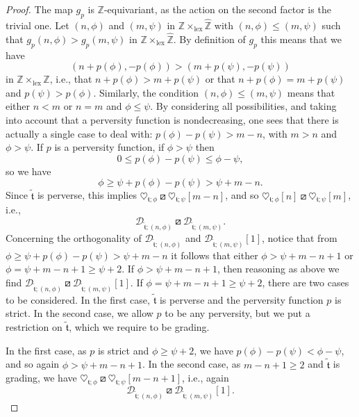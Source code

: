 \documentclass{article}
\theoremstyle{definition}
\newcommand{\Z}{\mathbb{Z}}
\newcommand{\tee}{\mathfrak{t}}
\newcommand{\orth}{\boxslash}
\begin{document}
\begin{proof}
The map $g_p$ is $\Z$-equivariant, as the action on the second factor is the trivial one.  Let $(n,\phi)$ and $(m,\psi)$ in $\Z\times_{\mathrm{lex}} \hat{\Z}$ with $(n,\phi)\leq (m,\psi)$ such that $g_p(n,\phi)>g_p(m,\psi)$ in $\Z\times_{\mathrm{lex}} \hat{\Z}$. By definition of $g_p$ this means that we have
\[
(n+p(\phi),-p(\phi))>(m+p(\psi),-p(\psi))
\]
in $\Z\times_{\mathrm{lex}} \Z$, i.e., that $n+p(\phi)>m+p(\psi)$ or that $n+p(\phi)=m+p(\psi)$ and $p(\psi)>p(\phi)$. Similarly, the condition $(n,\phi)\leq (m,\psi)$ means that either $n<m$ or $n=m$ and $\phi\leq \psi$. By considering all possibilities, and taking into account that a perversity function is nondecreasing, one sees that there is actually a single case to deal with:
$p(\phi)-p(\psi)>m-n$, with $m>n$ and $\phi>\psi$.
If $p$ is a perversity function, if $\phi> \psi$ then
\[
0\leq p(\phi)-p(\psi)\leq \phi-\psi,
\]
so we have
\[
\phi\geq  \psi+ p(\phi)-p(\psi)>\psi+m-n.
\]
Since $\tilde{\tee}$ is perverse, this implies $\heartsuit_{\tee;\phi}\orth\heartsuit_{\tee;\psi}[m-n]$, and so $\heartsuit_{\tee;\phi}[n]\orth \heartsuit_{\tee;\psi}[m]$, i.e.,
\[
\mathscr{D}_{\tilde{\tee};(n,\phi)}\orth\mathscr{D}_{\tilde{\tee};(m,\psi)}.
\]
Concerning the orthogonality of $\mathscr{D}_{\tilde{\tee};(n,\phi)}$ and $\mathscr{D}_{\tilde{\tee};(m,\psi)}[1]$, notice that
from $\phi\geq \psi+ p(\phi)-p(\psi)>\psi+m-n$ it follows that either $\phi>\psi+m-n+1$ or $\phi=\psi+m-n+1\geq \psi+2$.  If $\phi>\psi+m-n+1$, then reasoning as above we find $\mathscr{D}_{\tilde{\tee};(n,\phi)}\orth\mathscr{D}_{\tilde{\tee};(m,\psi)}[1]$. If $\phi=\psi+m-n+1\geq \psi+2$,
there are two cases to be considered. In the first case, $\tilde{\tee}$ is perverse and the perversity function $p$ is strict. In the second case, we allow $p$ to be any perversity, but we put a restriction on $\tilde{\tee}$, which we require to be grading.

In the first case, as $p$ is strict and $\phi\geq \psi+2$, we have $p(\phi)-p(\psi)< \phi-\psi$, and so again $\phi>\psi+m-n+1$.
In the second case, as $m-n+1\geq 2$ and $\tilde{\tee}$ is grading, we have $\heartsuit_{\tee;\phi}\orth\heartsuit_{\tee;\psi}[m-n+1]$, i.e., again
\[
\mathscr{D}_{\tilde{\tee};(n,\phi)}\orth\mathscr{D}_{\tilde{\tee};(m,\psi)}[1].
\]
\end{proof}
\end{document}
